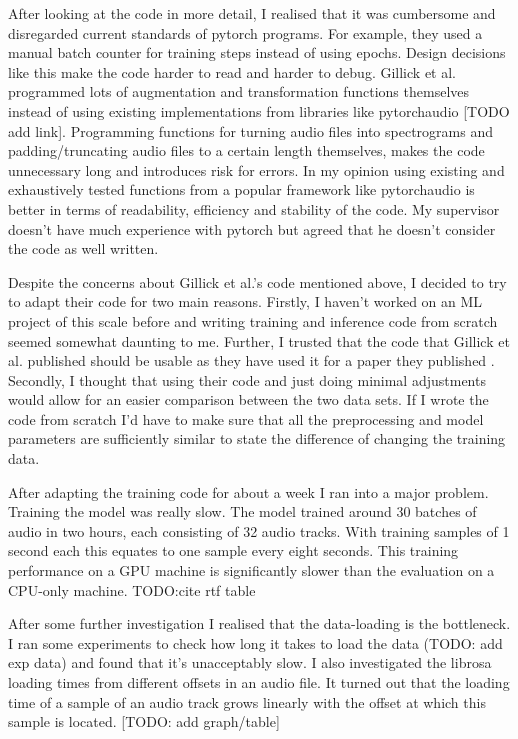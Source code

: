 \documentclass[bsc,frontabs,parskip,deptreport]{infthesis}
\begin{document}
After looking at the code in more detail, I realised that it was cumbersome and disregarded current standards of pytorch programs. 
For example, they used a manual batch counter for training steps instead of using epochs.  
Design decisions like this make the code harder to read and harder to debug. 
Gillick et al. programmed lots of augmentation and transformation functions themselves instead of using existing implementations from libraries like pytorchaudio [TODO add link]. 
Programming functions for turning audio files into spectrograms and padding/truncating audio files to a certain length themselves, makes the code unnecessary long and introduces risk for errors. In my opinion using existing and exhaustively tested functions from a popular framework like pytorchaudio is better in terms of readability, efficiency and stability of the code.
My supervisor doesn't have much experience with pytorch but agreed that he doesn't consider the code as well written.

Despite the concerns about Gillick et al.'s code mentioned above, I decided to try to adapt their code for two main reasons. 
Firstly, I haven't worked on an ML project of this scale before and writing training and inference code from scratch seemed somewhat daunting to me. Further, I trusted that the code that Gillick et al. published should be usable as they have used it for a paper they published \citep{gillick2021robust}. 
Secondly, I thought that using their code and just doing minimal adjustments would allow for an easier comparison between the two data sets. If I wrote the code from scratch I'd have to make sure that all the preprocessing and model parameters are sufficiently similar to state the difference of changing the training data. 

After adapting the training code for about a week I ran into a major problem. Training the model was really slow. The model trained around 30 batches of audio in two hours, each consisting of 32 audio tracks. 
With training samples of 1 second each this equates to one sample every eight seconds.
This training performance on a GPU machine is significantly slower than the evaluation on a CPU-only machine. TODO:cite rtf table

After some further investigation I realised that the data-loading is the bottleneck. I ran some experiments to check how long it takes to load the data (TODO: add exp data) and found that it's unacceptably slow. 
I also investigated the librosa loading times from different offsets in an audio file. It turned out that the loading time of a sample of an audio track grows linearly with the offset at which this sample is located. [TODO: add graph/table]
\end{document}
